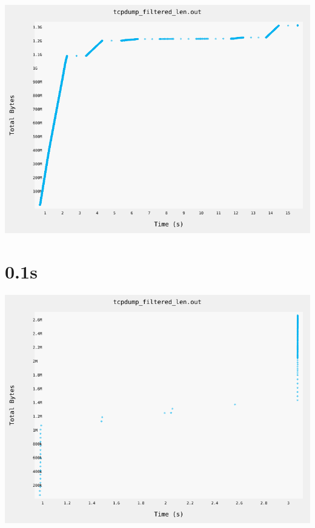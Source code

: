 \documentclass{article}
\begin{document}
    \begin{center}
        \includegraphics[angle=90]{set_c_1s/plot.png}
    \end{center}

    \clearpage

\section{0.1s}
    \noindent\begin{minipage}{.45\textwidth}
    
    \end{minipage}\hfill
    \begin{minipage}{.45\textwidth}
    
    \end{minipage}
    
    \begin{center}
        \includegraphics[angle=90]{set_c_0.1s/plot.png}
    \end{center}
\end{document}
